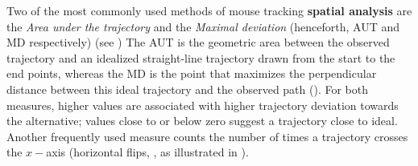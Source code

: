 \documentclass[draft]{article}
\begin{document}
Two of the most commonly used methods of mouse tracking \textbf{spatial analysis} are the \textit{Area under the trajectory} and the \textit{Maximal deviation} (henceforth, AUT and MD respectively) (see \citealp{Freeman2010})
The AUT is the geometric area between the observed trajectory and an idealized straight-line trajectory drawn from the start to the end points, whereas the MD is the point that maximizes the perpendicular distance between this ideal trajectory and the observed path
(). For both measures, higher values are associated with higher trajectory deviation towards the alternative; values close to or below zero suggest a trajectory close to ideal. 
Another frequently used measure  counts the number of times a trajectory crosses the $x-$axis (horizontal flips, \citealp{Dale2011}, as illustrated in ).
\end{document}
